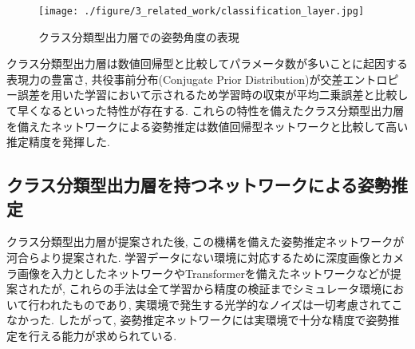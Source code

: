 \begin{figure}[thpb]
  \begin{minipage}[htpb]{1.0\hsize}
  \begin{center}
  \texttt{[image: ./figure/3\_related\_work/classification\_layer.jpg]}
  \caption{クラス分類型出力層での姿勢角度の表現}
  \label{fig:classification_layer}
  \end{center}
  \end{minipage}
\end{figure}

クラス分類型出力層は数値回帰型と比較してパラメータ数が多いことに起因する表現力\cite{Expressive_power_paper}の豊富さ, 共役事前分布(Conjugate Prior Distribution)\cite{Conjugate_Priors_paper}が交差エントロピー誤差\cite{Cross_Entropy_paper}を用いた学習において示されるため学習時の収束が平均二乗誤差\cite{MSE_Loss_paper}と比較して早くなるといった特性が存在する. これらの特性を備えたクラス分類型出力層を備えたネットワークによる姿勢推定は数値回帰型ネットワークと比較して高い推定精度を発揮した.

\subsection{クラス分類型出力層を持つネットワークによる姿勢推定}
クラス分類型出力層\cite{Kawai_SII2022}が提案された後, この機構を備えた姿勢推定ネットワークが河合らより提案された. 学習データにない環境に対応するために深度画像とカメラ画像を入力としたネットワーク\cite{Kawai_SII2023}やTransformerを備えたネットワーク\cite{Kawai_SI2022}などが提案されたが, これらの手法は全て学習から精度の検証までシミュレータ環境において行われたものであり, 実環境で発生する光学的なノイズは一切考慮されてこなかった. したがって, 姿勢推定ネットワークには実環境で十分な精度で姿勢推定を行える能力が求められている.
